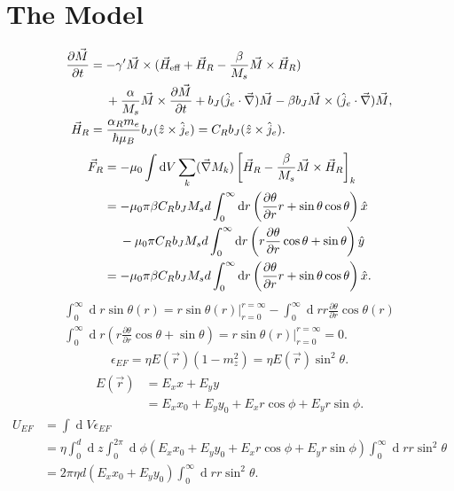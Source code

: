 \documentclass[12pt, a4paper, twoside, openright]{article}		%
\let\oldsection\section
\def\section{\cleardoublepage\oldsection}
\renewcommand{\d}[1]{\ensuremath{\operatorname{d}\!{#1}}}
\numberwithin{equation}{section}
\begin{document}
\section{The Model}
\begin{align}
\nonumber \frac{\partial \vec{M}}{\partial t} &= -\gamma'\vec{M}\times(\vec{H}_{\text{eff}}+\vec{H}_R-\frac{\beta}{M_s} \vec{M}\times\vec{H}_R) \\
&\hspace{4.5mm}+\frac{\alpha}{M_s}\vec{M}\times\frac{\partial\vec{M}}{\partial t} + b_J (\hat{j}_e\cdot\vec{\nabla})\vec{M} - \beta b_J \vec{M}\times(\hat{j}_e\cdot\vec{\nabla})\vec{M}, \\
\vec{H}_R &= \frac{\alpha_R m_e}{\hbar \mu_B}b_J (\hat{z}\times\hat{j}_e) = C_R b_J (\hat{z}\times\hat{j}_e).
\end{align}
\begin{align}
\vec{F}_R &= -\mu_0\int \d V\sum_k (\vec{\nabla}M_k)\left[\vec{H}_R - \frac{\beta}{M_s}\vec{M}\times\vec{H}_R\right]_k \\
&= -\mu_0 \pi\beta C_R b_J M_s d \int_0^{\infty} \d r \left(\frac{\partial \theta}{\partial r} r + \sin\theta\cos\theta \right) \hat{x} \\
&\hspace{4.5mm}- \mu_0 \pi C_R b_J M_s d \int_0^{\infty} \d r \left(r\frac{\partial \theta}{\partial r}\cos\theta + \sin\theta\right) \hat{y} \\
&= -\mu_0 \pi\beta C_R b_J M_s d \int_0^{\infty} \d r \left(\frac{\partial \theta}{\partial r} r + \sin\theta\cos\theta \right) \hat{x}.
\end{align}
\begin{align}
\int_0^{\infty} \d r \sin\theta(r) = r\sin\theta(r)|_{r = 0}^{r=\infty} - \int_0^{\infty} \d r r \frac{\partial \theta}{\partial r} \cos\theta(r) \\
\int_0^{\infty} \d r \left(r\frac{\partial \theta}{\partial r}\cos\theta + \sin\theta\right) = r\sin\theta(r)|_{r = 0}^{r=\infty} = 0.
\end{align}
\begin{align}
\epsilon_{EF} = \eta E(\vec{r}) \left(1-m_z^2\right) = \eta E(\vec{r}) \sin^2\theta.
\end{align}
\begin{align}
E(\vec{r}) &= E_x x + E_y y \\
&= E_x x_0 + E_y y_0 + E_x r \cos\phi + E_y r \sin\phi.
\end{align}
\begin{align}
U_{EF} &= \int \d V \epsilon_{EF} \\
&= \eta \int_0^d \d z \int_0^{2\pi}\d \phi \left( E_x x_0 + E_y y_0 + E_x r \cos\phi + E_y r \sin\phi \right) \int_0^{\infty}\d r r \sin^2\theta \\
&= 2\pi\eta d\left(E_x x_0 + E_y y_0\right)\int_0^{\infty}\d r r \sin^2\theta.
\end{align}
\end{document}

